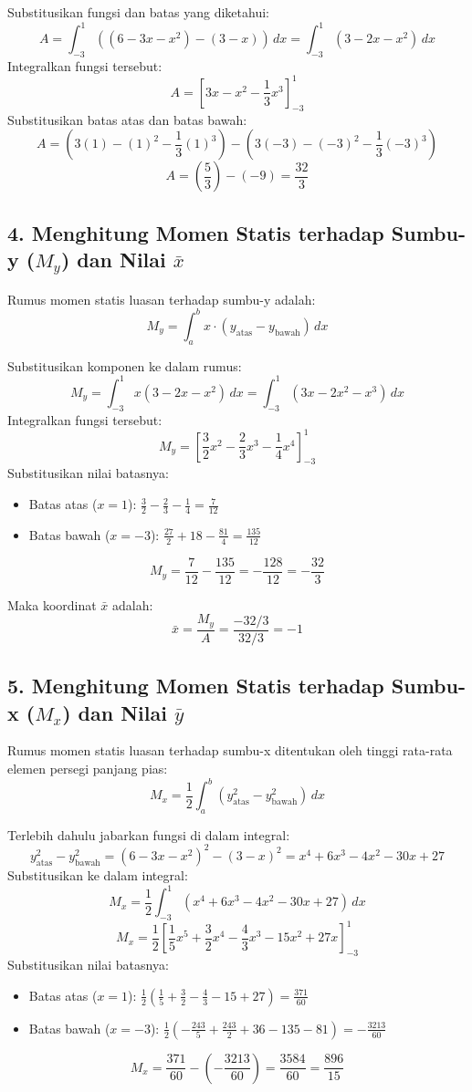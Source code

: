 \documentclass[12pt,a4paper]{article}
\begin{document}
Substitusikan fungsi dan batas yang diketahui:
\[
  A = \int_{-3}^{1} \left( (6 - 3x - x^2) - (3 - x) \right) \, dx = \int_{-3}^{1} (3 - 2x - x^2) \, dx
\]
Integralkan fungsi tersebut:
\[
  A = \left[ 3x - x^2 - \frac{1}{3}x^3 \right]_{-3}^{1}
\]
Substitusikan batas atas dan batas bawah:
\[
  A = \left( 3(1) - (1)^2 - \frac{1}{3}(1)^3 \right) - \left( 3(-3) - (-3)^2 - \frac{1}{3}(-3)^3 \right)
\]
\[
  A = \left( \frac{5}{3} \right) - (-9) = \frac{32}{3}
\]

\subsection*{4. Menghitung Momen Statis terhadap Sumbu-y ($M_y$) dan Nilai $\bar{x}$}
Rumus momen statis luasan terhadap sumbu-y adalah:
\[
  M_y = \int_{a}^{b} x \cdot (y_{\text{atas}} - y_{\text{bawah}}) \, dx
\]

Substitusikan komponen ke dalam rumus:
\[
  M_y = \int_{-3}^{1} x(3 - 2x - x^2) \, dx = \int_{-3}^{1} (3x - 2x^2 - x^3) \, dx
\]
Integralkan fungsi tersebut:
\[
  M_y = \left[ \frac{3}{2}x^2 - \frac{2}{3}x^3 - \frac{1}{4}x^4 \right]_{-3}^{1}
\]
Substitusikan nilai batasnya:
\begin{itemize}
  \item Batas atas ($x=1$): $\frac{3}{2} - \frac{2}{3} - \frac{1}{4} = \frac{7}{12}$
  \item Batas bawah ($x=-3$): $\frac{27}{2} + 18 - \frac{81}{4} = \frac{135}{12}$
\end{itemize}
\[
  M_y = \frac{7}{12} - \frac{135}{12} = -\frac{128}{12} = -\frac{32}{3}
\]

Maka koordinat $\bar{x}$ adalah:
\[
  \bar{x} = \frac{M_y}{A} = \frac{-32/3}{32/3} = -1
\]

\subsection*{5. Menghitung Momen Statis terhadap Sumbu-x ($M_x$) dan Nilai $\bar{y}$}
Rumus momen statis luasan terhadap sumbu-x ditentukan oleh tinggi rata-rata elemen persegi panjang pias:
\[
  M_x = \frac{1}{2} \int_{a}^{b} \left( y_{\text{atas}}^2 - y_{\text{bawah}}^2 \right) \, dx
\]

Terlebih dahulu jabarkan fungsi di dalam integral:
\[
  y_{\text{atas}}^2 - y_{\text{bawah}}^2 = (6 - 3x - x^2)^2 - (3 - x)^2 = x^4 + 6x^3 - 4x^2 - 30x + 27
\]
Substitusikan ke dalam integral:
\[
  M_x = \frac{1}{2} \int_{-3}^{1} (x^4 + 6x^3 - 4x^2 - 30x + 27) \, dx
\]
\[
  M_x = \frac{1}{2} \left[ \frac{1}{5}x^5 + \frac{3}{2}x^4 - \frac{4}{3}x^3 - 15x^2 + 27x \right]_{-3}^{1}
\]
Substitusikan nilai batasnya:
\begin{itemize}
  \item Batas atas ($x=1$): $\frac{1}{2} \left( \frac{1}{5} + \frac{3}{2} - \frac{4}{3} - 15 + 27 \right) = \frac{371}{60}$
  \item Batas bawah ($x=-3$): $\frac{1}{2} \left( -\frac{243}{5} + \frac{243}{2} + 36 - 135 - 81 \right) = -\frac{3213}{60}$
\end{itemize}
\[
  M_x = \frac{371}{60} - \left( -\frac{3213}{60} \right) = \frac{3584}{60} = \frac{896}{15}
\]
\end{document}
